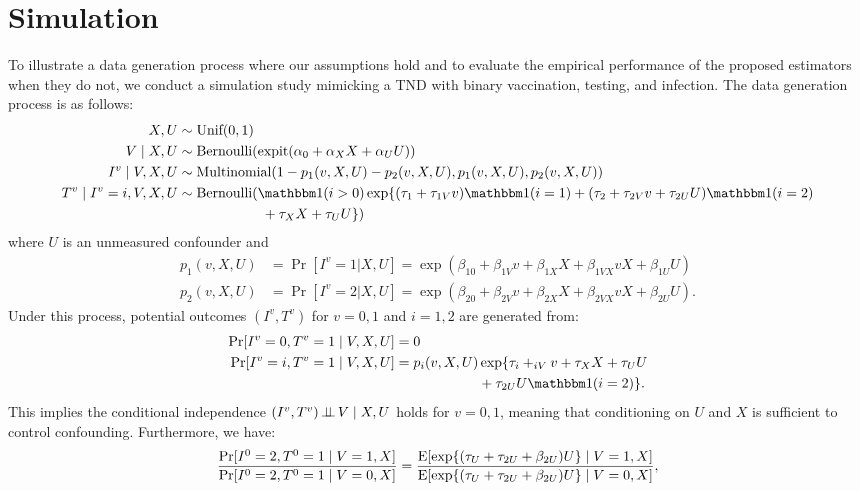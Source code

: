 \documentclass[11pt]{article}
\begin{document}
\section{Simulation}

To illustrate a data generation process where our assumptions hold and to evaluate the empirical performance of the proposed estimators when they do not, we conduct a simulation study mimicking a TND with binary vaccination, testing, and infection. The data generation process is as follows:
\begin{align*}
    X, U &\sim \text{Unif}(0,1)\\
    V\mid X, U & \sim \text{Bernoulli}(\expit(\alpha_0 + \alpha_X X + \alpha_U U))\\
    I^v \mid V, X, U &\sim \text{Multinomial}(1-p_1(v, X, U) - p_2(v, X, U), p_1(v, X, U), p_2(v, X, U))\\
    T^v\mid I^v=i, V, X, U &\sim \text{Bernoulli}(\mathbbm 1(i>0)\exp\{(\tau_{1} + \tau_{1V}v) \mathbbm 1(i=1) + (\tau_{2} + \tau_{2V} v + \tau_{2U} U ) \mathbbm 1(i=2) \\&\qquad \qquad\qquad + \tau_X X + \tau_U U \})
\end{align*}
where $U$ is an unmeasured confounder and
\begin{align*}
    p_1(v, X, U) & = \Pr[I^v = 1 | X, U] = \exp(\beta_{10} + \beta_{1V}v + \beta_{1X}X + \beta_{1VX}vX + \beta_{1U}U) \\
    p_2(v, X, U) & = \Pr[I^v = 2 | X, U] = \exp(\beta_{20} + \beta_{2V}v + \beta_{2X}X + \beta_{2VX}vX + \beta_{2U}U).
\end{align*}
Under this process, potential outcomes $(I^v, T^v)$ for $v=0,1$ and $i=1, 2$ are generated from:
\begin{align*}
    \Pr[I^v=0, T^v=1\mid V, X, U] &= 0\\
    \Pr[I^v=i, T^v=1\mid V, X, U] &= p_i(v, X, U)\exp\{\tau_i + _{iV} v + \tau_X X + \tau_U U \\&\qquad \qquad\qquad + \tau_{2U}U\mathbbm 1(i=2) \}.
\end{align*}
This implies the conditional independence $(I^v, T^v)\operatorname{\perp\!\!\!\perp} V\mid X, U$ holds for $v=0,1$, meaning that conditioning on $U$ and $X$ is sufficient to control confounding. Furthermore, we have:
\begin{align*}
    \dfrac{\Pr[I^0=2, T^0=1 \mid V=1,X]}{\Pr[I^0=2, T^0=1\mid V=0,X]}=\dfrac{\operatorname{E}[\exp\{(\tau_U  + \tau_{2U}+\beta_{2U})U\}\mid V=1, X]}{\operatorname{E}[\exp\{(\tau_U  + \tau_{2U}+\beta_{2U})U\}\mid V=0, X]},
\end{align*}
\end{document}
